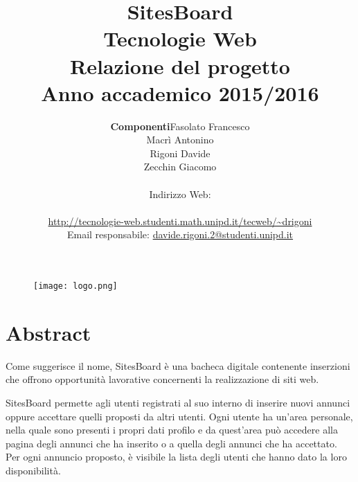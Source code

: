 \documentclass[12pt]{article}
\begin{document}
\begin{figure}
\centering
\texttt{[image: logo.png]}
\end{figure} 

\title{ \textbf{{\Huge SitesBoard}}\vspace{2cm} \\ {\Huge Tecnologie Web \\ Relazione del progetto} \\ {\Large Anno accademico 2015/2016} }
 
\author{
\begin{tabular}{r|l}
\textbf{Componenti} & Fasolato Francesco\\
&Macrì Antonino\\
&Rigoni Davide\\
&Zecchin Giacomo
\end{tabular}\vspace{0.5cm} \\
	Indirizzo Web: \\ \\ \url{http://tecnologie-web.studenti.math.unipd.it/tecweb/~drigoni}\vspace{0.3cm} \\
	Email responsabile: \href{mailto:davide.rigoni.2@studenti.unipd.it}{davide.rigoni.2@studenti.unipd.it} 
}

\maketitle
\thispagestyle{empty}


\newpage


\pagestyle{fancy}
\lhead{}
\cfoot{}
\renewcommand{\footrulewidth}{0.5pt}

\tableofcontents %



\newpage

\section{Abstract}
Come suggerisce il nome, SitesBoard è una bacheca digitale contenente inserzioni che offrono opportunità lavorative concernenti la realizzazione di siti web.

SitesBoard permette agli utenti registrati al suo interno di inserire nuovi annunci oppure accettare quelli proposti da altri utenti.
Ogni utente ha un’area personale, nella quale sono presenti i propri dati profilo e da quest’area può accedere alla pagina degli annunci che ha inserito o a quella degli annunci che ha accettato.
Per ogni annuncio proposto, è visibile la lista degli utenti che hanno dato la loro disponibilità. 
\end{document}
